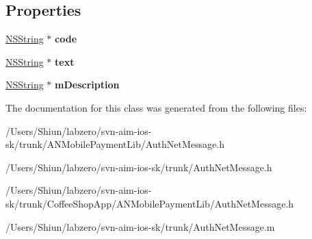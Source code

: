 \subsection*{Properties}
\begin{DoxyCompactItemize}
\item 
\hypertarget{interface_auth_net_message_aee8f0dd61ddf658e02ca5a794f3c2159}{
\hyperlink{class_n_s_string}{NSString} $\ast$ {\bfseries code}}
\label{interface_auth_net_message_aee8f0dd61ddf658e02ca5a794f3c2159}

\item 
\hypertarget{interface_auth_net_message_a09067b3c62dfeabdaa29232d5db62094}{
\hyperlink{class_n_s_string}{NSString} $\ast$ {\bfseries text}}
\label{interface_auth_net_message_a09067b3c62dfeabdaa29232d5db62094}

\item 
\hypertarget{interface_auth_net_message_a5202310319035988b22ec9e9914e9b95}{
\hyperlink{class_n_s_string}{NSString} $\ast$ {\bfseries mDescription}}
\label{interface_auth_net_message_a5202310319035988b22ec9e9914e9b95}

\end{DoxyCompactItemize}


The documentation for this class was generated from the following files:\begin{DoxyCompactItemize}
\item 
/Users/Shiun/labzero/svn-\/aim-\/ios-\/sk/trunk/ANMobilePaymentLib/AuthNetMessage.h\item 
/Users/Shiun/labzero/svn-\/aim-\/ios-\/sk/trunk/AuthNetMessage.h\item 
/Users/Shiun/labzero/svn-\/aim-\/ios-\/sk/trunk/CoffeeShopApp/ANMobilePaymentLib/AuthNetMessage.h\item 
/Users/Shiun/labzero/svn-\/aim-\/ios-\/sk/trunk/AuthNetMessage.m\end{DoxyCompactItemize}
